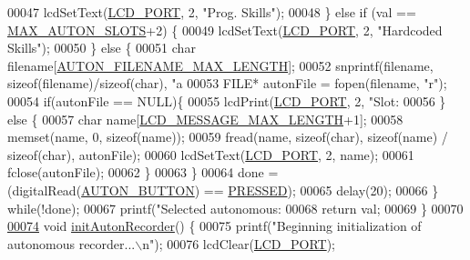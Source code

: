\begin{DoxyCode}
00047             lcdSetText(\hyperlink{lcdmsg_8h_abcf42bd88b3c36193f301ca25b033875}{LCD\_PORT}, 2, \textcolor{stringliteral}{"Prog. Skills"});
00048         \} \textcolor{keywordflow}{else} \textcolor{keywordflow}{if} (val == \hyperlink{autonrecorder_8h_a5173a11a545cb4020fdd139552dc15c1}{MAX\_AUTON\_SLOTS}+2) \{
00049             lcdSetText(\hyperlink{lcdmsg_8h_abcf42bd88b3c36193f301ca25b033875}{LCD\_PORT}, 2, \textcolor{stringliteral}{"Hardcoded Skills"});
00050         \} \textcolor{keywordflow}{else} \{
00051             \textcolor{keywordtype}{char} filename[\hyperlink{autonrecorder_8h_a9411d1482daa18dd8221c30db7fc6e4e}{AUTON\_FILENAME\_MAX\_LENGTH}];
00052             snprintf(filename, \textcolor{keyword}{sizeof}(filename)/\textcolor{keyword}{sizeof}(\textcolor{keywordtype}{char}), \textcolor{stringliteral}{"a%
00053             FILE* autonFile = fopen(filename, \textcolor{stringliteral}{"r"});
00054             \textcolor{keywordflow}{if}(autonFile == NULL)\{
00055                 lcdPrint(\hyperlink{lcdmsg_8h_abcf42bd88b3c36193f301ca25b033875}{LCD\_PORT}, 2, \textcolor{stringliteral}{"Slot: %
00056             \} \textcolor{keywordflow}{else} \{
00057                 \textcolor{keywordtype}{char} name[\hyperlink{lcdmsg_8h_abe4c4b70fc6f44ae3680e5b2c68cdd00}{LCD\_MESSAGE\_MAX\_LENGTH}+1];
00058                 memset(name, 0, \textcolor{keyword}{sizeof}(name));
00059                 fread(name, \textcolor{keyword}{sizeof}(\textcolor{keywordtype}{char}), \textcolor{keyword}{sizeof}(name) / \textcolor{keyword}{sizeof}(\textcolor{keywordtype}{char}), autonFile);
00060                 lcdSetText(\hyperlink{lcdmsg_8h_abcf42bd88b3c36193f301ca25b033875}{LCD\_PORT}, 2, name);
00061                 fclose(autonFile);
00062             \}
00063         \}
00064         done = (digitalRead(\hyperlink{autonrecorder_8h_a5e5e9512ca0c5f741113ae51b24258c1}{AUTON\_BUTTON}) == \hyperlink{friendly_8h_a654adff3c664f27f0b29c24af818dd26}{PRESSED});
00065         delay(20);
00066     \} \textcolor{keywordflow}{while}(!done);
00067     printf(\textcolor{stringliteral}{"Selected autonomous: %
00068     \textcolor{keywordflow}{return} val;
00069 \}
00070 
\hypertarget{autonrecorder_8c_source.tex_l00074}{}\hyperlink{autonrecorder_8h_acd89c8b2c622ae271c5d63d7fb8fa5f6}{00074} \textcolor{keywordtype}{void} \hyperlink{autonrecorder_8c_acd89c8b2c622ae271c5d63d7fb8fa5f6}{initAutonRecorder}() \{
00075     printf(\textcolor{stringliteral}{"Beginning initialization of autonomous recorder...\(\backslash\)n"});
00076     lcdClear(\hyperlink{lcdmsg_8h_abcf42bd88b3c36193f301ca25b033875}{LCD\_PORT});
}}}
\end{DoxyCode}
